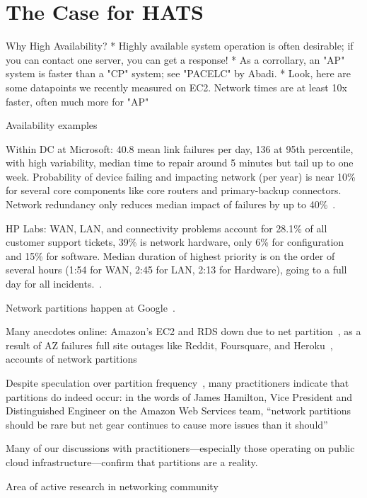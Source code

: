
\section{The Case for HATS}

Why High Availability?
* Highly available system operation is often desirable; if you can contact one server, you can get a response!
* As a corrollary, an "AP" system is faster than a "CP" system; see "PACELC" by Abadi.
	* Look, here are some datapoints we recently measured on EC2. Network times are at least 10x faster, often much more for "AP"


Availability examples

Within DC at Microsoft: 40.8 mean link failures per day, 136 at 95th
percentile, with high variability, median time to repair around 5
minutes but tail up to one week. Probability of device failing and
impacting network (per year) is near 10\% for several core components
like core routers and primary-backup connectors. Network redundancy
only reduces median impact of failures by up to
40\%~\cite{sigcomm-dc}. 

HP Labs: WAN, LAN, and connectivity problems account for 28.1\% of all
customer support tickets, 39\% is network hardware, only 6\% for
configuration and 15\% for software. Median duration of highest
priority is on the order of several hours (1:54 for WAN, 2:45 for LAN,
2:13 for Hardware), going to a full day for all
incidents.~\cite{turner2012failure}.

Network partitions happen at Google~\cite{dean-keynote}.

Many anecdotes online: Amazon's EC2 and RDS down due to net
partition~\cite{amazon-netpartition}, as a result of AZ failures full
site outages like Reddit, Foursquare, and Heroku~\cite{ec2-downsites},
accounts of network partitions~\cite{netpartition-anecdote1}

Despite speculation over partition
frequency~\cite{stonebraker2010errors}, many practitioners indicate
that partitions do indeed occur: in the words of James Hamilton, Vice
President and Distinguished Engineer on the Amazon Web Services team,
``network partitions should be rare but net gear continues to cause
more issues than it should''~\cite{hamilton-partitions}

Many of our discussions with practitioners---especially those
operating on public cloud infrastructure---confirm that partitions are
a reality.

Area of active research in networking
community~\cite{surviving-failures-bodik}


